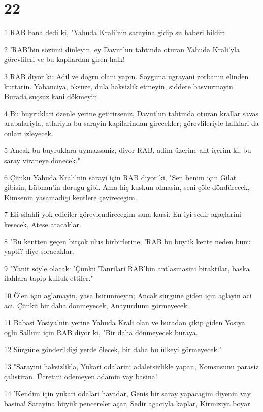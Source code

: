 \chapter{22}

\par 1 RAB bana dedi ki, "Yahuda Krali'nin sarayina gidip su haberi bildir:
\par 2 'RAB'bin sözünü dinleyin, ey Davut'un tahtinda oturan Yahuda Krali'yla görevlileri ve bu kapilardan giren halk!
\par 3 RAB diyor ki: Adil ve dogru olani yapin. Soyguna ugrayani zorbanin elinden kurtarin. Yabanciya, öksüze, dula haksizlik etmeyin, siddete basvurmayin. Burada suçsuz kani dökmeyin.
\par 4 Bu buyruklari özenle yerine getirirseniz, Davut'un tahtinda oturan krallar savas arabalariyla, atlariyla bu sarayin kapilarindan girecekler; görevlileriyle halklari da onlari izleyecek.
\par 5 Ancak bu buyruklara uymazsaniz, diyor RAB, adim üzerine ant içerim ki, bu saray viraneye dönecek."
\par 6 Çünkü Yahuda Krali'nin sarayi için RAB diyor ki, "Sen benim için Gilat gibisin, Lübnan'in dorugu gibi. Ama hiç kuskun olmasin, seni çöle döndürecek, Kimsenin yasamadigi kentlere çevirecegim.
\par 7 Eli silahli yok ediciler görevlendirecegim sana karsi. En iyi sedir agaçlarini kesecek, Atese atacaklar.
\par 8 "Bu kentten geçen birçok ulus birbirlerine, 'RAB bu büyük kente neden bunu yapti? diye soracaklar.
\par 9 "Yanit söyle olacak: 'Çünkü Tanrilari RAB'bin antlasmasini biraktilar, baska ilahlara tapip kulluk ettiler."
\par 10 Ölen için aglamayin, yasa bürünmeyin; Ancak sürgüne giden için aglayin aci aci. Çünkü bir daha dönmeyecek, Anayurdunu görmeyecek.
\par 11 Babasi Yosiya'nin yerine Yahuda Krali olan ve buradan çikip giden Yosiya oglu Sallum için RAB diyor ki, "Bir daha dönmeyecek buraya.
\par 12 Sürgüne gönderildigi yerde ölecek, bir daha bu ülkeyi görmeyecek."
\par 13 "Sarayini haksizlikla, Yukari odalarini adaletsizlikle yapan, Komsusunu parasiz çalistiran, Ücretini ödemeyen adamin vay basina!
\par 14 'Kendim için yukari odalari havadar, Genis bir saray yapacagim diyenin vay basina! Sarayina büyük pencereler açar, Sedir agaciyla kaplar, Kirmiziya boyar.
